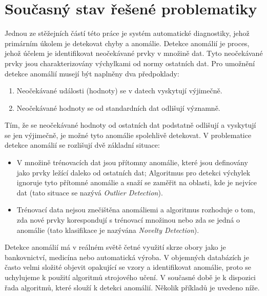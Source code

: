 \section*{Současný stav řešené problematiky} \label{sec:state_of_the_art}
\cite{scikit-learn} Jednou ze stěžejních částí této práce je systém automatické diagnostiky, jehož primárním úkolem je detekovat chyby a anomálie. Detekce anomálií je proces, jehož účelem je identifikovat neočekávané prvky v množině dat. Tyto neočekávané prvky jsou charakterizovány výchylkami od normy ostatních dat. Pro umožnění detekce anomálií musejí být naplněny dva předpoklady: 

\begin{enumerate}
	\item Neočekávané události (hodnoty) se v datech vyskytují výjimečně.
	\item Neočekávané hodnoty se od standardních dat odlišují významně.
\end{enumerate}

Tím, že se neočekávané hodnoty od ostatních dat podstatně odlišují a vyskytují se jen výjimečně, je možné tyto anomálie spolehlivě detekovat. V problematice detekce anomálií se rozlišují dvě základní situace: 

\begin{itemize}
	\item V množině trénovacích dat jsou přítomny anomálie, které jsou definovány jako prvky ležící daleko od ostatních dat; Algoritmus pro detekci výchylek ignoruje tyto přítomné anomálie a snaží se zaměřit na oblasti, kde je nejvíce dat (tato situace se nazývá \textit{Outlier Detection}).
	\item Trénovací data nejsou znečištěna anomáliemi a algoritmus rozhoduje o tom, zda nové prvky korespondují s trénovací množinou nebo zda se jedná o anomálie (tato klasifikace je nazývána \textit{Novelty Detection}).
\end{itemize}

Detekce anomálií má v reálném světě četné využití skrze obory jako je bankovnictví, medicína nebo automatická výroba. V objemných databázích je často velmi složité objevit opakující se vzory a identifikovat anomálie, proto se uchylujeme k použití algoritmů strojového učení. V současné době je k dispozici řada algoritmů, které slouží k detekci anomálií. Několik příkladů \cite{scikit-learn} je uvedeno níže.  \par

